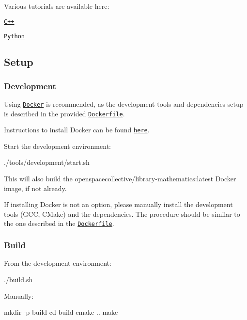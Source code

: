 Various tutorials are available here\+:


\begin{DoxyItemize}
\item \href{./tutorials/cpp}{\tt C++}
\item \href{./tutorials/python}{\tt Python}
\end{DoxyItemize}

\subsection*{Setup}

\subsubsection*{Development}

Using \href{https://www.docker.com}{\tt Docker} is recommended, as the development tools and dependencies setup is described in the provided \href{./tools/development/docker/Dockerfile}{\tt Dockerfile}.

Instructions to install Docker can be found \href{https://docs.docker.com/install/}{\tt here}.

Start the development environment\+:


\begin{DoxyCode}
./tools/development/start.sh
\end{DoxyCode}


This will also build the {\ttfamily openspacecollective/library-\/mathematics\+:latest} Docker image, if not already.

If installing Docker is not an option, please manually install the development tools (G\+CC, C\+Make) and the dependencies. The procedure should be similar to the one described in the \href{./tools/development/docker/Dockerfile}{\tt Dockerfile}.

\subsubsection*{Build}

From the development environment\+:


\begin{DoxyCode}
./build.sh
\end{DoxyCode}


Manually\+:


\begin{DoxyCode}
mkdir -p build
cd build
cmake ..
make
\end{DoxyCode}


